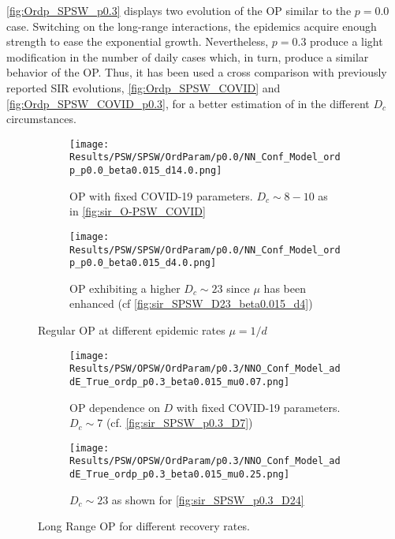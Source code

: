 \documentclass[a4paper,10pt,twoside]{book} %
\theoremstyle{definition}
\begin{document}
\autoref{fig:Ordp_SPSW_p0.3} displays two evolution of the OP similar to the $p = 0.0$ case.
Switching on the long-range interactions, the epidemics acquire enough strength to ease the exponential growth. Nevertheless, $p = 0.3$ produce a light modification in the number of daily cases which, in turn, produce a similar behavior of the OP. Thus, it has been used a cross comparison with previously reported SIR evolutions, \autoref{fig:Ordp_SPSW_COVID} and \autoref{fig:Ordp_SPSW_COVID_p0.3}, for a better estimation of in the different $D_c$ circumstances.
\begin{figure}[t]
	\begin{subfigure}{0.48\linewidth}
		\centering
		\texttt{[image: Results/PSW/SPSW/OrdParam/p0.0/NN\_Conf\_Model\_ordp\_p0.0\_beta0.015\_d14.0.png]} 
		\caption{OP with fixed COVID-19 parameters. \newline $D_c \sim 8-10$ as in \autoref{fig:sir_O-PSW_COVID}}
		\label{fig:Ordp_SPSW_COVID-19_d14}
	\end{subfigure}
	\begin{subfigure}{0.48\linewidth}
		\centering
		\texttt{[image: Results/PSW/SPSW/OrdParam/p0.0/NN\_Conf\_Model\_ordp\_p0.0\_beta0.015\_d4.0.png]}
		\caption{OP exhibiting a higher $D_c \sim 23$ since $\mu$ has been enhanced (cf \autoref{fig:sir_SPSW_D23_beta0.015_d4})}
		\label{fig:Ordp_SPSW_d1.0_COVID19}
	\end{subfigure}
	\caption{Regular OP at different epidemic rates $\mu = 1/d$}
	\label{fig:Ordp_SPSW_COVID}
\end{figure}

\begin{figure}[t]
	\begin{subfigure}{0.48\linewidth}
		\texttt{[image: Results/PSW/OPSW/OrdParam/p0.3/NNO\_Conf\_Model\_addE\_True\_ordp\_p0.3\_beta0.015\_mu0.07.png]}
		\caption{OP dependence on $D$ with fixed COVID-19 parameters. $D_c \sim 7$ \cite{Thurner::NetBasedExpl} (cf. \autoref{fig:sir_SPSW_p0.3_D7})}
		\label{fig:Ordp_SPSW_p0.3}
	\end{subfigure}
	\begin{subfigure}{0.48\linewidth}
		\texttt{[image: Results/PSW/OPSW/OrdParam/p0.3/NNO\_Conf\_Model\_addE\_True\_ordp\_p0.3\_beta0.015\_mu0.25.png]}
		\caption{$D_c \sim 23$ as shown for \autoref{fig:sir_SPSW_p0.3_D24}}
		\label{fig:Ordp_SPSW_d4_p0.3}
	\end{subfigure}
	\caption{Long Range OP for different recovery rates.}
	\label{fig:Ordp_SPSW_COVID_p0.3}
\end{figure}
\end{document}
